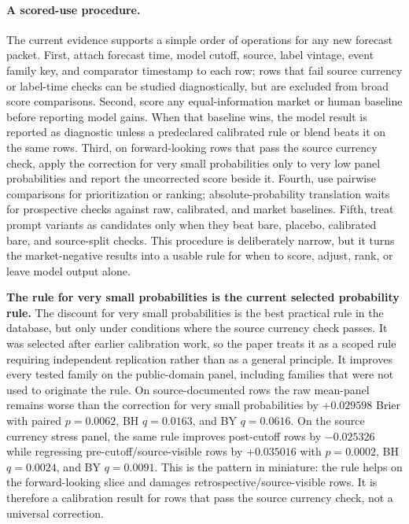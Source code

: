\documentclass[11pt]{article}
\begin{document}
\paragraph{A scored-use procedure.} The current evidence supports a simple order of operations for any new forecast packet. First, attach forecast time, model cutoff, source, label vintage, event family key, and comparator timestamp to each row; rows that fail source currency or label-time checks can be studied diagnostically, but are excluded from broad score comparisons. Second, score any equal-information market or human baseline before reporting model gains. When that baseline wins, the model result is reported as diagnostic unless a predeclared calibrated rule or blend beats it on the same rows. Third, on forward-looking rows that pass the source currency check, apply the correction for very small probabilities only to very low panel probabilities and report the uncorrected score beside it. Fourth, use pairwise comparisons for prioritization or ranking; absolute-probability translation waits for prospective checks against raw, calibrated, and market baselines. Fifth, treat prompt variants as candidates only when they beat bare, placebo, calibrated bare, and source-split checks. This procedure is deliberately narrow, but it turns the market-negative results into a usable rule for when to score, adjust, rank, or leave model output alone.

\textbf{The rule for very small probabilities is the current selected probability rule.} The discount for very small probabilities is the best practical rule in the database, but only under conditions where the source currency check passes. It was selected after earlier calibration work, so the paper treats it as a scoped rule requiring independent replication rather than as a general principle. It improves every tested family on the public-domain panel, including families that were not used to originate the rule. On source-documented rows the raw mean-panel remains worse than the correction for very small probabilities by \(+0.029598\) Brier with paired \(p=0.0062\), BH \(q=0.0163\), and BY \(q=0.0616\). On the source currency stress panel, the same rule improves post-cutoff rows by \(-0.025326\) while regressing pre-cutoff/source-visible rows by \(+0.035016\) with \(p=0.0002\), BH \(q=0.0024\), and BY \(q=0.0091\). This is the pattern in miniature: the rule helps on the forward-looking slice and damages retrospective/source-visible rows. It is therefore a calibration result for rows that pass the source currency check, not a universal correction.
\end{document}
